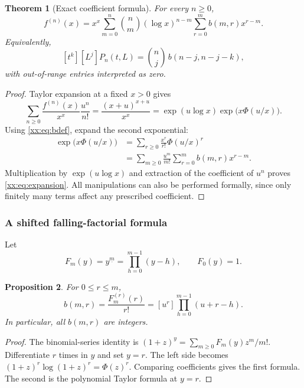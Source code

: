 \documentclass[11pt,a4paper]{article}
\numberwithin{equation}{section}
\newtheorem{theorem}{Theorem}[section]
\newtheorem{proposition}[theorem]{Proposition}
\theoremstyle{definition}
\theoremstyle{remark}
\theoremstyle{plain}
\newcommand{\coef}[2]{[#1^{#2}]}
\newcommand{\fall}[2]{#1^{\underline{#2}}}
\begin{document}
\begin{theorem}[Exact coefficient formula]\label{xx:thm:expansion}
For every $n\ge0$,
\begin{equation}\label{xx:eq:expansion}
 \boxed{\displaystyle
 f^{(n)}(x)=x^x\sum_{m=0}^n\binom nm (\log x)^{n-m}
                         \sum_{r=0}^m b(m,r)x^{r-m}.}
\end{equation}
Equivalently,
\begin{equation}\label{xx:eq:cformula}
 \coef{t}{k}\coef{L}{j}P_n(t,L)
 =\binom nj\,b(n-j,n-j-k),
\end{equation}
with out-of-range entries interpreted as zero.
\end{theorem}
\begin{proof}
Taylor expansion at a fixed $x>0$ gives
\[
 \sum_{n\ge0}\frac{f^{(n)}(x)}{x^x}\frac{u^n}{n!}
 =\frac{(x+u)^{x+u}}{x^x}
 =\exp(u\log x)\exp\bigl(x\Phi(u/x)\bigr).
\]
Using \eqref{xx:eq:bdef}, expand the second exponential:
\begin{align*}
 \exp\bigl(x\Phi(u/x)\bigr)
 &=\sum_{r\ge0}\frac{x^r}{r!}\Phi(u/x)^r\\
 &=\sum_{m\ge0}\frac{u^m}{m!}\sum_{r=0}^m b(m,r)x^{r-m}.
\end{align*}
Multiplication by $\exp(u\log x)$ and extraction of the coefficient of
$u^n$ proves \eqref{xx:eq:expansion}. All manipulations can also be performed
formally, since only finitely many terms affect any prescribed coefficient.
\end{proof}

\subsubsection{A shifted falling-factorial formula}
Let
\[
 F_m(y)=\fall{y}{m}=\prod_{h=0}^{m-1}(y-h),\qquad F_0(y)=1.
\]

\begin{proposition}\label{xx:prop:falling}
For $0\le r\le m$,
\begin{equation}\label{xx:eq:falling}
 b(m,r)=\frac{F_m^{(r)}(r)}{r!}
       =\coef{u}{r}\prod_{h=0}^{m-1}(u+r-h).
\end{equation}
In particular, all $b(m,r)$ are integers.
\end{proposition}
\begin{proof}
The binomial-series identity is
$(1+z)^y=\sum_{m\ge0}F_m(y)z^m/m!$.
Differentiate $r$ times in $y$ and set $y=r$. The left side becomes
$(1+z)^r\log(1+z)^r=\Phi(z)^r$. Comparing coefficients gives the first
formula. The second is the polynomial Taylor formula at $y=r$.
\end{proof}
\end{document}
